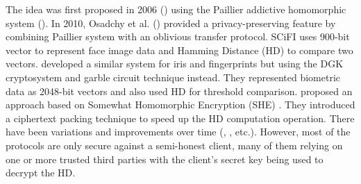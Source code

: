The idea was first proposed in 2006 (\cite{schoenmakers2006efficient}) using the Paillier addictive homomorphic system
(\cite{paillier1999public}). In 2010, Osadchy et al. (\cite{osadchy2010scifi}) provided a privacy-preserving feature by
combining Paillier system with an oblivious transfer protocol. SCiFI uses 900-bit vector to represent face image data and
Hamming Distance (HD) to compare two vectors. \cite{blanton2011secure} developed a similar system for iris and
fingerprints but using the DGK cryptosystem \cite{damgard2008homomorphic} and garble circuit technique instead. They
represented biometric data as 2048-bit vectors and also used HD for threshold comparison. \cite{yasuda2014practical}
proposed an approach based on Somewhat Homomorphic Encryption (SHE) \cite{brakerski2011fully}. They introduced a
ciphertext packing technique to speed up the HD computation operation. There have been variations and improvements over
time (\cite{shahandashti2012private}, \cite{mandal2015comprehensive}, etc.). However, most of the protocols are only
secure against a semi-honest client, many of them relying on one or more trusted third parties with the client's secret key being used to decrypt the HD.



